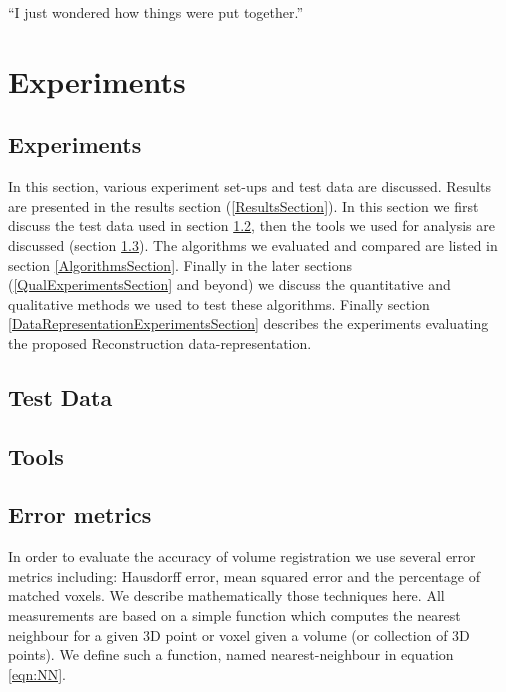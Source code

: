 \begin{savequote}[8cm]
  ``I just wondered how things were put together.''
\end{savequote}
\makeatletter
\chapter{Experiments}
\label{ch:Experiments}

\section{Experiments}

In this section, various experiment set-ups and test data are discussed. Results are presented in the results section (\ref{ResultsSection}). In this section we first discuss the test data used in section \ref{TestDataSection}, then the tools we used for analysis are discussed (section \ref{ToolsSection}). The algorithms we evaluated and compared are listed in section \ref{AlgorithmsSection}. Finally in the later sections (\ref{QualExperimentsSection} and beyond) we discuss the quantitative and qualitative methods we used to test these algorithms. Finally section \ref{DataRepresentationExperimentsSection} describes the experiments evaluating the proposed Reconstruction data-representation. 

\section{Test Data}
\label{TestDataSection}


\section{Tools}
\label{ToolsSection}


\section{Error metrics}

\label{metricsSection}

In order to evaluate the accuracy of volume registration we use several error metrics including: Hausdorff error, mean squared error and the percentage of matched voxels. We describe mathematically those techniques here. All measurements are based on a simple function which computes the nearest neighbour for a given 3D point or voxel given a volume (or collection of 3D points). We define such a function, named nearest-neighbour in equation \ref{eqn:NN}.

